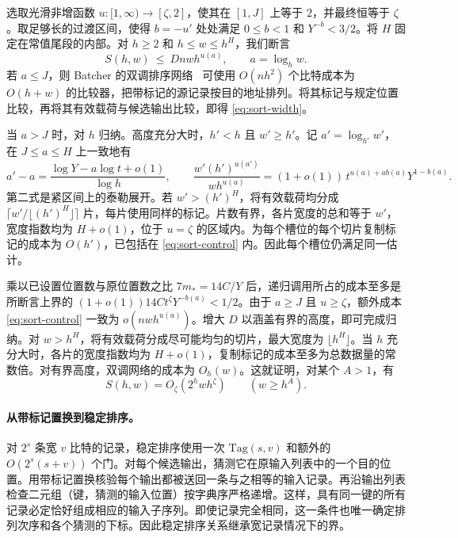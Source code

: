 选取光滑非增函数 $u:[1,\infty)\to[\zeta,2]$，使其在 $[1,J]$ 上等于 $2$，并最终恒等于 $\zeta$。取足够长的过渡区间，使得 $b=-u'$ 处处满足 $0\le b<1$ 和 $Y^{-b}<3/2$。将 $H$ 固定在常值尾段的内部。对 $h\ge2$ 和 $h\le w\le h^H$，我们断言 \begin{equation}
       S(h,w)\ \le\ D n w h^{u(a)},\qquad a=\log_h w .
       \label{eq:sort-width}
\end{equation} 若 $a\le J$，则 Batcher 的双调排序网络~\cite{batcher} 可使用 $O(nh^2)$ 个比特成本为 $O(h+w)$ 的比较器，把带标记的源记录按目的地址排列。将其标记与规定位置比较，再将其有效载荷与候选输出比较，即得 \eqref{eq:sort-width}。

当 $a>J$ 时，对 $h$ 归纳。高度充分大时，$h'<h$ 且 $w'\ge h'$。记 $a'=\log_{h'}w'$，在 $J\le a\le H$ 上一致地有 \[
 a'-a=\frac{\log Y-a\log t+o(1)}{\log h},
 \qquad
 \frac{w'(h')^{u(a')}}{w h^{u(a)}}
   =(1+o(1))\,t^{u(a)+a b(a)}Y^{1-b(a)}.
\] 第二式是紧区间上的泰勒展开。若 $w'>(h')^H$，将有效载荷均分成 $\lceil w'/\lfloor(h')^H\rfloor\rceil$ 片，每片使用同样的标记。片数有界，各片宽度的总和等于 $w'$，宽度指数均为 $H+o(1)$，位于 $u=\zeta$ 的区域内。为每个槽位的每个切片复制标记的成本为 $O(h')$，已包括在 \eqref{eq:sort-control} 内。因此每个槽位仍满足同一估计。

乘以已设置位置数与原位置数之比 $7m_*=14C/Y$ 后，递归调用所占的成本至多是所断言上界的 $(1+o(1))14C t^\zeta Y^{-b(a)}<1/2$。由于 $a\ge J$ 且 $u\ge\zeta$，额外成本 \eqref{eq:sort-control} 一致为 $o(nwh^{u(a)})$。增大 $D$ 以涵盖有界的高度，即可完成归纳。对 $w>h^H$，将有效载荷分成尽可能均匀的切片，最大宽度为 $\lfloor h^H\rfloor$。当 $h$ 充分大时，各片的宽度指数均为 $H+o(1)$，复制标记的成本至多为总数据量的常数倍。对有界高度，双调网络的成本为 $O_h(w)$。这就证明，对某个 $A>1$，有 \begin{equation}
         S(h,w)=O_\zeta(2^h w h^\zeta)\qquad(w\ge h^A).
         \label{eq:sort-all-wide}
\end{equation}

\paragraph{从带标记置换到稳定排序。}对 $2^s$ 条宽 $v$ 比特的记录，稳定排序使用一次 $\mathrm{Tag}(s,v)$ 和额外的 $O(2^s(s+v))$ 个门。对每个候选输出，猜测它在原输入列表中的一个目的位置。用带标记置换核验每个输出都被送回一条与之相等的输入记录。再沿输出列表检查二元组（键，猜测的输入位置）按字典序严格递增。这样，具有同一键的所有记录必定恰好组成相应的输入子序列。即使记录完全相同，这一条件也唯一确定排列次序和各个猜测的下标。因此稳定排序关系继承宽记录情况下的界。

